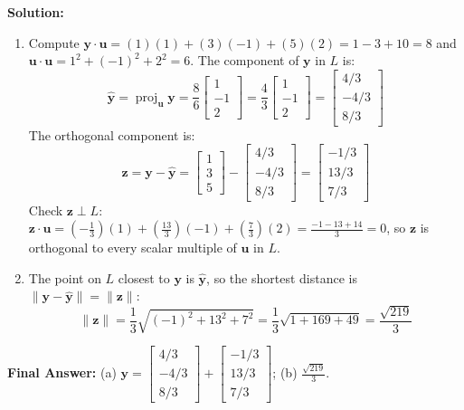 \documentclass[11pt, letterpaper]{article}
\theoremstyle{definition}
\theoremstyle{remark}
\begin{document}
\textbf{Solution:}
\begin{enumerate}[label=(\alph*)]
    \item Compute $\mathbf{y} \cdot \mathbf{u} = (1)(1) + (3)(-1) + (5)(2) = 1 - 3 + 10 = 8$ and $\mathbf{u} \cdot \mathbf{u} = 1^2 + (-1)^2 + 2^2 = 6$. The component of $\mathbf{y}$ in $L$ is:
    \[
    \hat{\mathbf{y}} = \operatorname{proj}_{\mathbf{u}}\mathbf{y} = \frac{8}{6}\begin{bmatrix} 1 \\ -1 \\ 2 \end{bmatrix} = \frac{4}{3}\begin{bmatrix} 1 \\ -1 \\ 2 \end{bmatrix} = \begin{bmatrix} 4/3 \\ -4/3 \\ 8/3 \end{bmatrix}
    \]
    The orthogonal component is:
    \[
    \mathbf{z} = \mathbf{y} - \hat{\mathbf{y}} = \begin{bmatrix} 1 \\ 3 \\ 5 \end{bmatrix} - \begin{bmatrix} 4/3 \\ -4/3 \\ 8/3 \end{bmatrix} = \begin{bmatrix} -1/3 \\ 13/3 \\ 7/3 \end{bmatrix}
    \]
    Check $\mathbf{z} \perp L$: $\mathbf{z} \cdot \mathbf{u} = \left(-\frac{1}{3}\right)(1) + \left(\frac{13}{3}\right)(-1) + \left(\frac{7}{3}\right)(2) = \frac{-1 - 13 + 14}{3} = 0$, so $\mathbf{z}$ is orthogonal to every scalar multiple of $\mathbf{u}$ in $L$.
    \item The point on $L$ closest to $\mathbf{y}$ is $\hat{\mathbf{y}}$, so the shortest distance is $\|\mathbf{y} - \hat{\mathbf{y}}\| = \|\mathbf{z}\|$:
    \[
    \|\mathbf{z}\| = \frac{1}{3}\sqrt{(-1)^2 + 13^2 + 7^2} = \frac{1}{3}\sqrt{1 + 169 + 49} = \frac{\sqrt{219}}{3}
    \]
\end{enumerate}
\textbf{Final Answer:} (a) $\mathbf{y} = \begin{bmatrix} 4/3 \\ -4/3 \\ 8/3 \end{bmatrix} + \begin{bmatrix} -1/3 \\ 13/3 \\ 7/3 \end{bmatrix}$; (b) $\frac{\sqrt{219}}{3}$.
\end{document}
